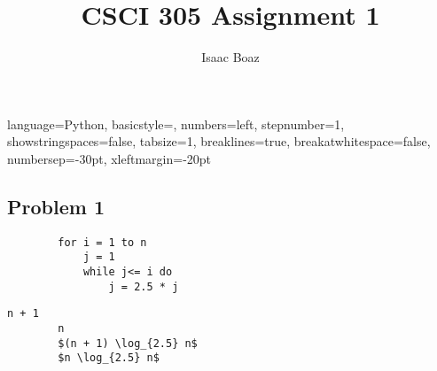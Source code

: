 \documentclass{article}
\title{CSCI 305 Assignment 1}
\author{Isaac Boaz}
\begin{document}
\maketitle

\lstset
{ %
    language=Python,
    basicstyle=\footnotesize,
    numbers=left,
    stepnumber=1,
    showstringspaces=false,
    tabsize=1,
    breaklines=true,
    breakatwhitespace=false,
    numbersep=-30pt,
    xleftmargin=-20pt
}
\setlength{\columnseprule}{0.1pt}

\subsection*{Problem 1}
\begin{multicols}{2}
    \begin{lstlisting}
        for i = 1 to n
            j = 1
            while j<= i do
                j = 2.5 * j
    \end{lstlisting}
    \columnbreak
    \begin{lstlisting}[numbers=none,mathescape]
        n + 1
        n
        $(n + 1) \log_{2.5} n$
        $n \log_{2.5} n$ 
    \end{lstlisting}
\end{multicols}
\end{document}
